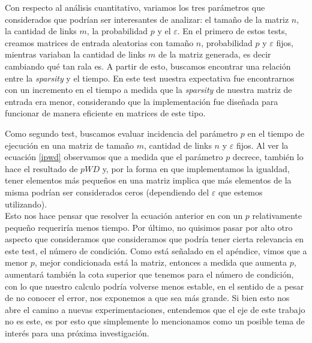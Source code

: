 \par 

Con respecto al an\'alisis cuantitativo, variamos los tres par\'ametros que considerados que podr\'ian ser interesantes de analizar:
el tama\~no de la matriz $n$, la cantidad de links $m$, la probabilidad $p$ y el $\varepsilon$.
\newline
En el primero de estos tests, creamos matrices de entrada aleatorias con tamaño $n$, probabilidad $p$ y $\varepsilon$ fijos, mientras variaban la cantidad de links $m$
de la matriz generada, es decir cambiando qu\'e tan rala es. A partir de esto, buscamos encontrar una relaci\'on entre la \textit{sparsity} y el tiempo.\newline
En este test nuestra expectativa fue encontrarnos con un incremento en el tiempo a medida 
que la \textit{sparsity} de nuestra matriz de entrada era menor, considerando que la
implementaci\'on fue diseñada para funcionar de manera eficiente en matrices de este tipo.

\par
Como segundo test, buscamos evaluar incidencia del par\'ametro $p$ en el tiempo de ejecuci\'on en una matriz de tamaño $m$, cantidad de links $n$ 
y $\varepsilon$ fijos.\newline
Al ver la ecuaci\'on \ref{ipwd} observamos que a medida que el par\'ametro $p$ decrece, tambi\'en lo hace el resultado de $pWD$ y, 
por la forma en que implementamos la igualdad, tener elementos m\'as pequeños en una matriz implica que m\'as elementos de la misma podr\'ian 
ser considerados ceros (dependiendo del $\varepsilon$ que estemos utilizando).\\
Esto nos hace pensar que resolver la ecuaci\'on anterior en con un $p$ relativamente pequeño  requerir\'ia menos tiempo.
Por \'ultimo, no quisimos pasar por alto otro aspecto que consideramos que consideramos que podr\'ia tener cierta relevancia en este test, el n\'umero de condici\'on. 
Como est\'a señalado en el ap\'endice, vimos que a menor $p$, mejor condicionada est\'a la matriz, entonces a medida que aumenta $p$, 
aumentar\'a tambi\'en la cota superior que tenemos para el n\'umero de condici\'on, con lo que nuestro calculo podr\'ia volverse menos estable, 
en el sentido de a pesar de no conocer el error, nos exponemos a que sea m\'as grande.
Si bien esto nos abre el camino a nuevas experimentaciones, entendemos que el eje de este trabajo no es este, es por esto que simplemente lo mencionamos como un posible tema de inter\'es para una pr\'oxima investigaci\'on.

